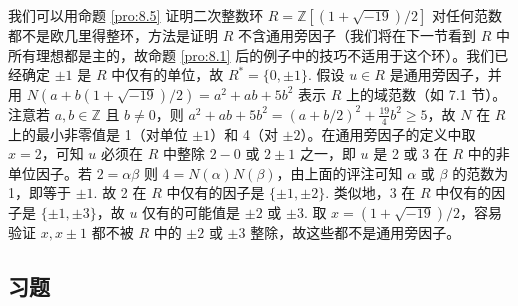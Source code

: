 \begin{example}
我们可以用命题 \ref{pro:8.5} 证明二次整数环 \(R = \mathbb{Z}[(1+\sqrt{-19})/2]\) 对任何范数都不是欧几里得整环，方法是证明 \(R\) 不含通用旁因子（我们将在下一节看到 \(R\) 中所有理想都是主的，故命题 \ref{pro:8.1} 后的例子中的技巧不适用于这个环）。我们已经确定 \(\pm 1\) 是 \(R\) 中仅有的单位，故 \(R^* = \{0, \pm 1\}\). 假设 \(u \in R\) 是通用旁因子，并用 \(N(a + b(1+\sqrt{-19})/2) = a^2 + ab + 5b^2\) 表示 \(R\) 上的域范数（如 7.1 节）。注意若 \(a, b \in \mathbb{Z}\) 且 \(b \neq 0\)，则 \(a^2+ab+5b^2 = (a+b/2)^2 + \tfrac{19}{4}b^2 \geq 5\)，故 \(N\) 在 \(R\) 上的最小非零值是 1（对单位 \(\pm 1\)）和 4（对 \(\pm 2\)）。在通用旁因子的定义中取 \(x = 2\)，可知 \(u\) 必须在 \(R\) 中整除 \(2-0\) 或 \(2\pm 1\) 之一，即 \(u\) 是 2 或 3 在 \(R\) 中的非单位因子。若 \(2 = \alpha\beta\) 则 \(4 = N(\alpha)N(\beta)\)，由上面的评注可知 \(\alpha\) 或 \(\beta\) 的范数为 1，即等于 \(\pm 1\). 故 2 在 \(R\) 中仅有的因子是 \(\{\pm 1, \pm 2\}\). 类似地，3 在 \(R\) 中仅有的因子是 \(\{\pm 1, \pm 3\}\)，故 \(u\) 仅有的可能值是 \(\pm 2\) 或 \(\pm 3\). 取 \(x = (1+\sqrt{-19})/2\)，容易验证 \(x, x\pm 1\) 都不被 \(R\) 中的 \(\pm 2\) 或 \(\pm 3\) 整除，故这些都不是通用旁因子。
\end{example}

\subsection*{习题}

